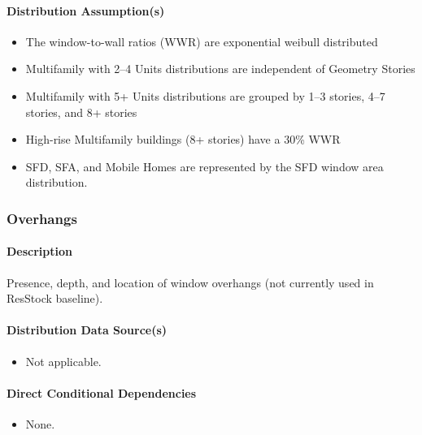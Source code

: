 \paragraph{Distribution Assumption(s)}
\begin{itemize}
 
\item
  The window-to-wall ratios (WWR) are exponential weibull distributed
\item
  Multifamily with 2--4 Units distributions are independent of Geometry
  Stories
\item
  Multifamily with 5+ Units distributions are grouped by 1--3 stories,
  4--7 stories, and 8+ stories
\item
  High-rise Multifamily buildings (8+ stories) have a 30\% WWR
\item
  SFD, SFA, and Mobile Homes are represented by the SFD window area
  distribution.
\end{itemize}
\subsubsection{Overhangs}\label{overhangs}
\paragraph{Description}
Presence, depth, and location of window overhangs (not currently used in ResStock baseline).
\paragraph{Distribution Data Source(s)}
\begin{itemize}
\item Not applicable.
\end{itemize}
\paragraph{Direct Conditional Dependencies}

\begin{itemize}
    \item None.
\end{itemize}

